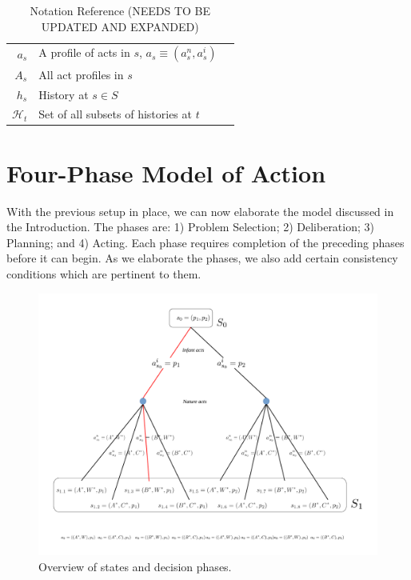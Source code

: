 \documentclass[
11pt,
titlepage,
reqno,
]{article}%
\theoremstyle{definition}
\begin{document}
\begin{table}
\begin{tabular}{@{}rll@{}}
$a_s$                                       & A profile of acts in $s$, $a_s\equiv(a^n_s,a^i_s)$ & \\
$A_s$                                    & All act profiles in $s$                               & \\
$h_s$                                & History at $s\in S$                                    &  \\
$\mathcal{H}_t$                                    & Set of all subsets of histories at $t$                & \\
\bottomrule
\end{tabular}
\caption{Notation Reference (NEEDS TO BE UPDATED AND EXPANDED)}\label{Tab: Notation}
\end{table}
\pagebreak



\section{Four-Phase Model of Action}

With the previous setup in place, we can now elaborate the model discussed in the Introduction.
The phases are: 1) Problem Selection; 2) Deliberation; 3) Planning; and 4) Acting.
Each phase requires completion of the preceding phases before it can begin.
As we elaborate the phases, we also add certain consistency conditions which are pertinent to them.


\begin{figure}[h!]
	\centering
	\includegraphics*[page=9,trim = 0in 3in 0in 0in,scale=.65]{Awareness_Diagrams_All}
	\caption{Overview of states and decision phases.\label{Diag: p-09}}%
\end{figure}
\end{document}
